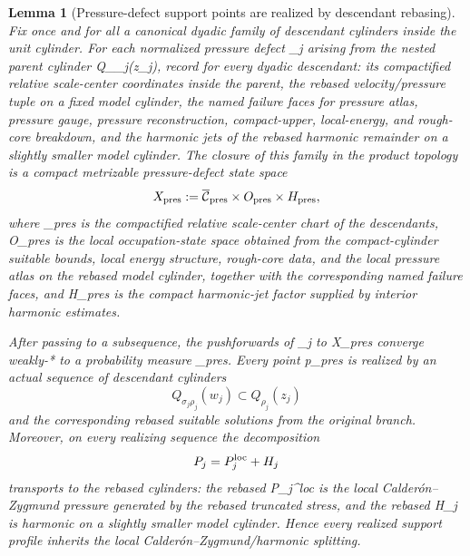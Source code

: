 \documentclass[11pt]{amsart}
\def\({}%
\def\){}%
\def\mathfrak#1{#1}%
\theoremstyle{plain}
\newtheorem{lemma}[lemma]{Lemma}
\theoremstyle{definition}
\theoremstyle{remark}
\begin{document}
\begin{lemma}[Pressure-defect support points are realized by descendant rebasing]
\label{paper8:lem:pressure-defect-support-realization}
Fix once and for all a canonical dyadic family of descendant cylinders inside the
unit cylinder.  For each normalized pressure defect \(\pi_j\) arising from the
nested parent cylinder \(Q_{\rho_j}(z_j)\), record for every dyadic descendant:
its compactified relative scale-center coordinates inside the parent, the
rebased velocity/pressure tuple on a fixed model cylinder, the named failure
faces for pressure atlas, pressure gauge, pressure reconstruction,
compact-upper, local-energy, and rough-core breakdown, and the harmonic jets
of the rebased harmonic remainder on a slightly smaller model cylinder.  The
closure of this family in the product topology is a compact metrizable
pressure-defect state space
\[
  \mathfrak X_{\rm pres}
  :=
  \overline{\mathcal C}_{\rm pres}
  \times \mathfrak O_{\rm pres}
  \times \mathfrak H_{\rm pres},
\]
where \(_{\rm pres}\) is the compactified relative
scale-center chart of the descendants, \(\mathfrak O_{\rm pres}\) is the local
occupation-state space obtained from the compact-cylinder suitable bounds,
local energy structure, rough-core data, and the local pressure atlas on the
rebased model cylinder, together with the corresponding named failure faces, and
\(\mathfrak H_{\rm pres}\) is the compact harmonic-jet factor supplied by
interior harmonic estimates.

After passing to a subsequence, the pushforwards of \(\pi_j\) to
\(\mathfrak X_{\rm pres}\) converge weakly-* to a probability measure
\(\Pi_{\rm pres}\).  Every point
\(\mathfrak p\in{}\Pi_{\rm pres}\) is realized by an actual
sequence of descendant cylinders
\[
  Q_{\sigma_j\rho_j}(w_j)\subset Q_{\rho_j}(z_j)
\]
and the corresponding rebased suitable solutions from the original branch.
Moreover, on every realizing sequence the decomposition
\[
  P_j=P_j^{\rm loc}+H_j
\]
transports to the rebased cylinders: the rebased \(P_j^{\rm loc}\) is the local
Calder\'on--Zygmund pressure generated by the rebased truncated stress, and the
rebased \(H_j\) is harmonic on a slightly smaller model cylinder.  Hence every
realized support profile inherits the local Calder\'on--Zygmund/harmonic
splitting.
\end{lemma}
\end{document}
